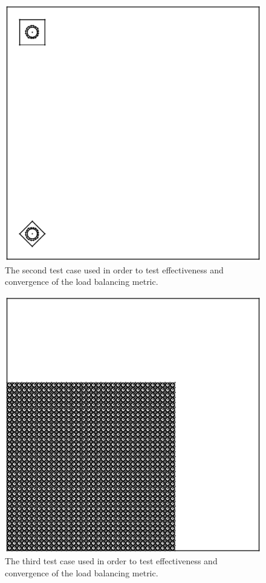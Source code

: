 \documentclass{anstrans}
\begin{document}
\begin{figure}[H]
\centering
\includegraphics[scale = 0.5]{figures/unbalanced_pins_same_side.eps}
\caption{The second test case used in order to test effectiveness and convergence of the load balancing metric.}
\label{same}
\end{figure}

\begin{figure}[H]
\centering
\includegraphics[scale = 0.5]{figures/lattice-12-shifted.eps}
\caption{The third test case used in order to test effectiveness and convergence of the load balancing metric.}
\label{lattice}
\end{figure}
\end{document}
